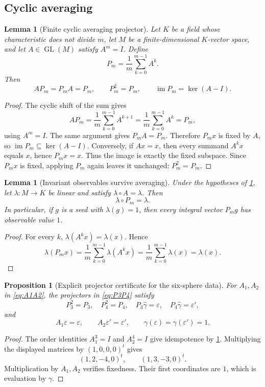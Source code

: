 \documentclass[11pt,reqno]{amsart}
\numberwithin{equation}{section}
\newcommand{\im}{\operatorname{im}}
\newcommand{\eps}{\varepsilon}
\newcommand{\epsp}{\varepsilon'}
\newcommand{\wideg}{\widehat\gamma}
\newtheorem{proposition}[theorem]{Proposition}
\newtheorem{lemma}[theorem]{Lemma}
\theoremstyle{definition}
\begin{document}
\subsection{Cyclic averaging}

\begin{lemma}[Finite cyclic averaging projector]\label{lem:cyclic-projector}
Let $K$ be a field whose characteristic does not divide $m$, let $M$ be a finite-dimensional $K$-vector space, and let $A\in\operatorname{GL}(M)$ satisfy $A^m=I$. Define
\[
P_m=\frac1m\sum_{k=0}^{m-1}A^k.
\]
Then
\[
AP_m=P_mA=P_m,
\qquad
P_m^2=P_m,
\qquad
\im P_m=\ker(A-I).
\]
\end{lemma}

\begin{proof}
The cyclic shift of the sum gives
\[
AP_m=\frac1m\sum_{k=0}^{m-1}A^{k+1}
=\frac1m\sum_{k=0}^{m-1}A^k=P_m,
\]
using $A^m=I$. The same argument gives $P_mA=P_m$. Therefore $P_mx$ is fixed by $A$, so $\im P_m\subseteq\ker(A-I)$. Conversely, if $Ax=x$, then every summand $A^kx$ equals $x$, hence $P_mx=x$. Thus the image is exactly the fixed subspace. Since $P_mx$ is fixed, applying $P_m$ again leaves it unchanged: $P_m^2=P_m$.
\end{proof}

\begin{lemma}[Invariant observables survive averaging]\label{lem:observable}
Under the hypotheses of \cref{lem:cyclic-projector}, let $\lambda:M\to K$ be linear and satisfy $\lambda\circ A=\lambda$. Then
\[
\lambda\circ P_m=\lambda.
\]
In particular, if $g$ is a seed with $\lambda(g)=1$, then every integral vector $P_mg$ has observable value $1$.
\end{lemma}

\begin{proof}
For every $k$, $\lambda(A^kx)=\lambda(x)$. Hence
\[
\lambda(P_mx)=\frac1m\sum_{k=0}^{m-1}\lambda(A^kx)
=\frac1m\sum_{k=0}^{m-1}\lambda(x)=\lambda(x).
\]
\end{proof}

\begin{proposition}[Explicit projector certificate for the six-sphere data]\label{prop:projector-certificate}
For $A_1,A_2$ in \cref{eq:A1A2}, the projectors in \cref{eq:P3P4} satisfy
\[
P_3^2=P_3,
\quad
P_4^2=P_4,
\quad
P_3\wideg=\eps,
\quad
P_4\wideg=\epsp,
\]
and
\[
A_1\eps=\eps,
\qquad
A_2\epsp=\epsp,
\qquad
\gamma(\eps)=\gamma(\epsp)=1.
\]
\end{proposition}

\begin{proof}
The order identities $A_1^3=I$ and $A_2^4=I$ give idempotence by \cref{lem:cyclic-projector}. Multiplying the displayed matrices by $(1,0,0,0)^t$ gives
\[
(1,2,-4,0)^t,
\qquad
(1,3,-3,0)^t.
\]
Multiplication by $A_1,A_2$ verifies fixedness. Their first coordinates are $1$, which is evaluation by $\gamma$.
\end{proof}
\end{document}

